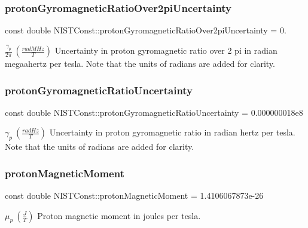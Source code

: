 \subsubsection{\texorpdfstring{proton\+Gyromagnetic\+Ratio\+Over2pi\+Uncertainty}{protonGyromagneticRatioOver2piUncertainty}}
{\footnotesize\ttfamily const double N\+I\+S\+T\+Const\+::proton\+Gyromagnetic\+Ratio\+Over2pi\+Uncertainty = 0.}

$\frac{\gamma_p}{2\pi} \ (\frac{rad MHz}{T})$ Uncertainty in proton gyromagnetic ratio over 2 pi in radian megaahertz per tesla. Note that the units of radians are added for clarity. \mbox{\label{group___proton_gaa71b7de7eab3c78be5f0fa7851d284e2}} 
\subsubsection{\texorpdfstring{proton\+Gyromagnetic\+Ratio\+Uncertainty}{protonGyromagneticRatioUncertainty}}
{\footnotesize\ttfamily const double N\+I\+S\+T\+Const\+::proton\+Gyromagnetic\+Ratio\+Uncertainty = 0.\+000000018e8}

$\gamma_p \ (\frac{rad Hz}{T})$ Uncertainty in proton gyromagnetic ratio in radian hertz per tesla. Note that the units of radians are added for clarity. \mbox{\label{group___proton_ga931c9d53a62cee8eb68b4e930d0cf5a6}} 
\subsubsection{\texorpdfstring{proton\+Magnetic\+Moment}{protonMagneticMoment}}
{\footnotesize\ttfamily const double N\+I\+S\+T\+Const\+::proton\+Magnetic\+Moment = 1.\+4106067873e-\/26}

$\mu_p \ (\frac{J}{T})$ Proton magnetic moment in joules per tesla. \mbox{\label{group___proton_gab71f8e2de250b48e9bbac602b69999de}} 
